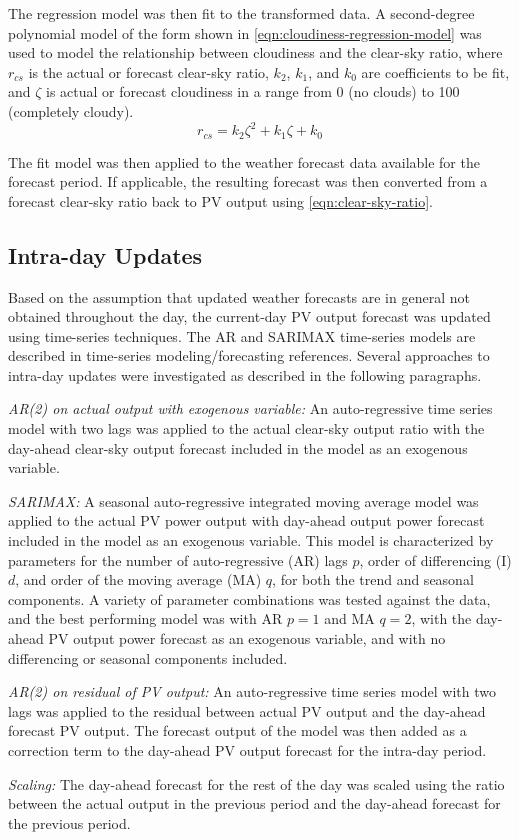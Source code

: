 The regression model was then fit to the transformed data.
A second-degree polynomial model of the form shown in \cref{eqn:cloudiness-regression-model} was used to model the relationship between cloudiness and the clear-sky ratio, where
$r_{cs}$ is the actual or forecast clear-sky ratio,
$k_2$, $k_1$, and $k_0$ are coefficients to be fit, and
$\zeta$ is actual or forecast cloudiness in a range from 0 (no clouds) to 100 (completely cloudy).
%
\begin{equation}
	\label{eqn:cloudiness-regression-model}
	r_{cs} = k_2 \zeta^2 + k_1 \zeta + k_0
\end{equation}

The fit model was then applied to the weather forecast data available for the forecast period.
If applicable, the resulting forecast was then converted from a forecast clear-sky ratio back to PV output using \cref{eqn:clear-sky-ratio}.

\subsection{Intra-day Updates}
\label{sec:method-intraday}

Based on the assumption that updated weather forecasts are in general not obtained throughout the day, the current-day PV output forecast was updated using time-series techniques.
The AR and SARIMAX time-series models are described in time-series modeling/forecasting references\cite{box2015time,korstanje2021}.
Several approaches to intra-day updates were investigated as described in the following paragraphs.

\textit{AR(2) on actual output with exogenous variable:}
An auto-regressive time series model with two lags was applied to the actual clear-sky output ratio with the day-ahead clear-sky output forecast included in the model as an exogenous variable.

\textit{SARIMAX:}
A seasonal auto-regressive integrated moving average model was applied to the actual PV power output with day-ahead output power forecast included in the model as an exogenous variable.
This model is characterized by parameters for the number of auto-regressive (AR) lags $p$, order of differencing (I) $d$, and order of the moving average (MA) $q$, for both the trend and seasonal components.
A variety of parameter combinations was tested against the data, and the best performing model was with AR $p=1$ and MA $q=2$, with the day-ahead PV output power forecast as an exogenous variable, and with no differencing or seasonal components included.

\textit{AR(2) on residual of PV output:}
An auto-regressive time series model with two lags was applied to the residual between actual PV output and the day-ahead forecast PV output. The forecast output of the model was then added as a correction term to the day-ahead PV output forecast for the intra-day period.

\textit{Scaling:}
The day-ahead forecast for the rest of the day was scaled using the ratio between the actual output in the previous period and the day-ahead forecast for the previous period.

